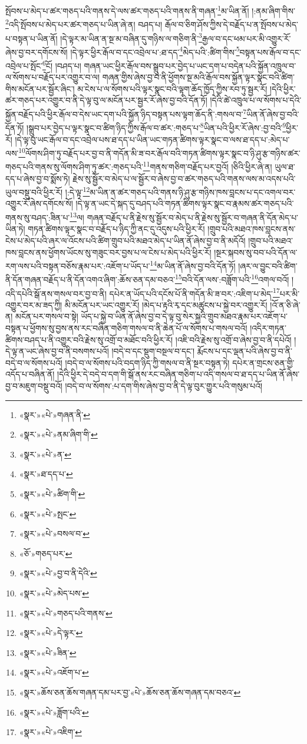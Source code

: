 སྤོབས་པ་མེད་པ་ཚར་གཅད་པའི་གནས་དེ་ལས་ཚར་གཅད་པའི་གནས་ནི་གཞན་\footnote{«སྣར་»«པེ་»གཞན་ནི་}མ་ཡིན་ནོ། །:ནམ་ཞིག་གིས་\footnote{«སྣར་»«པེ་»ནམ་ཞིག་གི་}འདི་སྤོབས་པ་མེད་པར་ཚར་གཅད་པ་ཡིན་ཞེ་ན། བཤད་པ། རྒོལ་བ་ཅིག་ཤོས་ཀྱིས་དེ་བརྗོད་པ་ན་སྤོབས་པ་མེད་པ་བསྟན་པ་ཡིན་ནོ། །དེ་ལྟར་མ་ཡིན་ན་སྔ་མ་བཞིན་དུ་གཉིས་ལ་གཅིག་ནི་\footnote{«སྣར་»«པེ་»ན་}རྒྱལ་བ་དང་ཕམ་པར་མི་འགྱུར་རོ་ཞེས་བྱ་བར་དགོངས་སོ། །དེ་ལྟར་ཕྱིར་རྒོལ་བ་དང་འབྲེལ་པ་:ཐ་དད་\footnote{«སྣར་»ཐ་དད་པ་}མེད་པའི་:ཚིག་གིས་\footnote{«སྣར་»«པེ་»ཚིག་གི་}བསྟན་པས་རྒོལ་བ་དང་འབྲེལ་པ་སྤོང་\footnote{«སྣར་»«པེ་»སྤང་}ངོ། །བཤད་པ། གཞན་ཡང་ཕྱིར་རྒོལ་བས་སྒྲུབ་པར་བྱེད་པ་ཡང་དག་པ་བདེན་པའི་སྐྱོན་འཁྲུལ་བ་ལ་སོགས་པ་བརྗོད་པར་འགྱུར་བ་ལ། གཞན་གྱིས་ཞེས་བྱ་བ་ནི་ཕྱོགས་སྔ་མའི་རྒོལ་བས་སྐྱོན་ལྟར་སྣང་བའི་ཚིག་གིས་མངོན་པར་སྦྱོར་ཞིང་། མ་ངེས་པ་ལ་སོགས་པའི་ལྟར་སྣང་བའི་ལྟག་ཆོད་ཁྱོད་ཀྱིས་རབ་ཏུ་སྦྱར་རོ། །དེའི་ཕྱིར་ཚར་གཅད་པར་འགྱུར་བ་ནི་དེ་ལྟ་བུ་ལ་མངོན་པར་སྦྱར་རོ་ཞེས་བྱ་བའི་དོན་ཏོ། །དེའི་ཚེ་འཁྲུལ་པ་ལ་སོགས་པ་དེའི་སྐྱོན་བརྗོད་པའི་ཕྱིར་རྒོལ་བ་དེས་ཡང་དག་པའི་སྐྱོན་ཉིད་བསྟན་པས་ལྟག་ཆོད་ནི་:གསལ་བ་\footnote{«སྣར་»«པེ་»བསལ་བ་}ཡིན་ནོ་ཞེས་བྱ་བའི་དོན་ཏོ། །སྒྲུབ་པར་བྱེད་པ་ལྟར་སྣང་བ་ཚིག་ཉིད་ཀྱིས་རྒོལ་བ་ཚར་:གཅད་པ་\footnote{«ཅོ་»གཅད་པར་}ཡིན་པའི་ཕྱིར་རོ་ཞེས་:བྱ་བའི་\footnote{«སྣར་»«པེ་»བྱ་བ་ནི་དེའི་}ཕྱིར་རོ། །དེ་ལྟ་བུ་ཡང་རྒོལ་བ་དང་འབྲེལ་པས་ཐ་དད་པ་ཡིན་ཡང་གཏན་ཚིགས་ལྟར་སྣང་བ་ལས་ཐ་དད་པ་:མེད་པ་ལས་\footnote{«སྣར་»«པེ་»མེད་པས་}ལོགས་ཤིག་ཏུ་བརྗོད་པར་བྱ་བ་ནི་གདོན་མི་ཟ་བར་རྒོལ་བའི་གཏན་ཚིགས་ལྟར་སྣང་བ་ཉི་ཤུ་རྩ་གཉིས་ཚར་གཅད་པའི་གནས་སུ་ལོགས་ཤིག་ཏུ་ཚར་:གཅད་པའི་\footnote{«སྣར་»«པེ་»གཅད་པའི་གནས་}གནས་གཅིག་བརྗོད་པར་བྱའོ། །ཅིའི་ཕྱིར་ཞེ་ན། ཡུལ་ཐ་དད་པ་ཞེས་བྱ་བ་སྨོས་ཏེ། རྗེས་སུ་སྦྱོར་བ་མེད་པ་ལ་སྦྱོར་བ་ཞེས་བྱ་བ་ཚར་གཅད་པའི་གནས་ལས་མ་འདས་པའི་ཡུལ་བསྡུ་བའི་ཕྱིར་རོ། །:དེ་ལྟ་\footnote{«སྣར་»«པེ་»དེ་ལྟར་}མ་ཡིན་ན་ཚར་གཅད་པའི་གནས་ཉི་ཤུ་རྩ་གཉིས་ཁས་བླངས་པ་དང་འགལ་བར་འགྱུར་རོ་ཞེས་དགོངས་སོ། །དེ་ལྟ་ན་ཡང་དེ་སྐད་དུ་བཤད་པའི་གཏན་ཚིགས་ལྟར་སྣང་བ་རྣམས་ཚར་གཅད་པའི་གནས་སུ་བཤད་:ཟིན་པ་\footnote{«སྣར་»«པེ་»ཟིན་}ལ། གཞན་བརྗོད་པ་ནི་རྗེས་སུ་སྦྱོར་བ་མེད་པ་ནི་རྗེས་སུ་སྦྱོར་བ་གཞན་ནི་དོན་མེད་པ་ཡིན་ཏེ། གཏན་ཚིགས་ལྟར་སྣང་བ་བརྗོད་པ་ཉིད་ཀྱི་ནང་དུ་འདུས་པའི་ཕྱིར་རོ། །གྲུབ་པའི་མཐའ་ཁས་བླངས་ནས་ངེས་པ་མེད་པའི་ཞར་ལ་འོངས་པའི་ཚིག་གྲུབ་པའི་མཐའ་མེད་པ་ཡིན་ནོ་ཞེས་བྱ་བ་ནི་མདོའོ། །གྲུབ་པའི་མཐའ་ཁས་བླངས་ནས་ཕྱོགས་ཡོངས་སུ་གཟུང་བར་བྱས་པ་ལ་ངེས་པ་མེད་པའི་ཕྱིར་རོ། །སྔར་སྐབས་སུ་བབ་པའི་དོན་ལ་རག་ལས་པའི་བསྟན་བཅོས་རྣམ་པར་:འཇོག་པ་ཡོད་པ་\footnote{«སྣར་»«པེ་»འཇོག་པ་}མ་ཡིན་ནོ་ཞེས་བྱ་བའི་དོན་ཏོ། །ཞར་ལ་བྱུང་བའི་ཚིག་ནི་དོན་གཞན་བརྗོད་པ་ནི་དོན་འགའ་ཞིག་:ཆོས་ཅན་དམ་བཅའ་\footnote{«སྣར་»ཆོས་ཅན་ཆོས་གཞན་དམ་པར་བྱ་«པེ་»ཆོས་ཅན་ཆོས་གཞན་དམ་བཅའ་}བའི་དོན་ལས་:བཟློག་པའི་\footnote{«སྣར་»«པེ་»ཟློག་པའི་}འགལ་བའོ། །འདི་དཔེའི་སྒོ་ནས་གསལ་བར་བྱ་བ་ནི། དཔེར་ན་ཡོད་པའི་དངོས་པོ་ནི་གདོན་མི་ཟ་བར་:འཇིག་པ་མེད་\footnote{«སྣར་»«པེ་»འཇིག་}པར་མི་འགྱུར་བར་མ་ཟད་ཀྱི། མི་མངོན་པར་ཡང་འགྱུར་རོ། །མེད་པ་རྟའི་རྭ་དང་མཚུངས་པ་སྐྱེ་བར་འགྱུར་རོ། །འོ་ན་ཅི་ཞེ་ན། མངོན་པར་གསལ་བ་སྟེ། ཡོད་པ་སྐྱེ་བ་ཡིན་ནོ་ཞེས་བྱ་བ་དེ་ལྟ་བུ་སེར་སྐྱའི་གྲུབ་མཐའ་རྣམ་པར་འཇོག་པ་བསྟན་པ་ཕྱོགས་སུ་བྱས་ནས་རང་བཞིན་གཅིག་གསལ་བ་ནི་ཆེན་པོ་ལ་སོགས་པ་གསལ་བའོ། །འདིར་གཏན་ཚིགས་བཤད་པ་ནི་འགྱུར་བའི་རྗེས་སུ་འགྲོ་བ་མཐོང་བའི་ཕྱིར་རོ། །འཇི་བའི་རྗེས་སུ་འགྲོ་བ་ཞེས་བྱ་བ་ནི་དཔེའོ། །དེ་ལྟ་ན་ཡང་ཞེས་བྱ་བ་ནི་བསགས་པའོ། །བདེ་བ་དང་སྡུག་བསྔལ་བ་དང་། རྨོངས་པ་དང་ལྡན་པའི་ཞེས་བྱ་བ་ནི་བདེ་བ་ལ་སོགས་པའོ། །བདེ་བ་ལ་སོགས་པའི་བདག་ཉིད་ཀྱི་གསལ་བ་ནི་སྔར་བསྟན་ཏེ། དཔེར་ན་གྲངས་ཅན་གྱི་འདོད་པ་བཞིན་ནོ། །དེའི་ཕྱིར་དེ་བདེ་བ་དག་གི་སྒོ་ནས་རང་བཞིན་གཅིག་པ་འདི་གསལ་བ་ཐ་དད་པ་ཡིན་ནོ་ཞེས་བྱ་བ་མཇུག་བསྡུ་བའོ། །བདེ་བ་ལ་སོགས་:པ་དག་གིས་ཞེས་བྱ་བ་ནི་དེ་ལྟ་བུར་གྱུར་པའི་གསུམ་པའོ། 